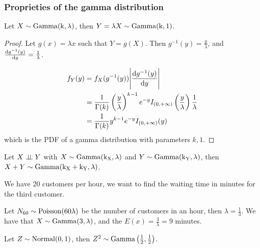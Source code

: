 \documentclass[12pt]{extarticle}
\begin{document}
\subsubsection{Proprieties of the gamma distribution}

\begin{theorem}
    Let $X \sim \operatorfont{Gamma}(k, \lambda)$, then $Y = \lambda X \sim \operatorfont{Gamma}(k, 1)$.
\end{theorem}

\begin{proof}
    Let $g(x) = \lambda x$ such that $Y = g(X)$.
    Then $g^{-1}(y) = \frac{y}{\lambda}$, and $\dv{g^{-1}(y)}{y} = \frac{1}{\lambda}$.

    \begin{align}
        f_Y(y) & = f_X(g^{-1}(y)) \abs{\dv{g^{-1}(y)}{y}}                                                                                           \\
               & = \frac{1}{\Gamma(k)} \left(\frac{y}{\lambda}\right)^{k-1} e^{-y} I_{(0, +\infty)}\left(\frac{y}{\lambda}\right) \frac{1}{\lambda} \\
               & = \frac{1}{\Gamma(k)} y^{k-1} e^{-y} I_{(0, +\infty)}(y)                                                                           \\
    \end{align}
    which is the PDF of a gamma distribution with parameters $k, 1$.
\end{proof}

\begin{theorem}
    Let $X \perp \!\!\! \perp Y$ with $X \sim \operatorfont{Gamma}(k_X, \lambda)$ and $Y \sim \operatorfont{Gamma}(k_Y, \lambda)$, then $X + Y \sim \operatorfont{Gamma}(k_X + k_Y, \lambda)$.
\end{theorem}

\begin{example}
    We have 20 customers per hour, we want to find the waiting time in minutes for the third customer.

    Let $N_{60} \sim \operatorfont{Poisson(60\lambda)}$ be the number of customers in an hour, then $\lambda = \frac{1}{3}$.
    We have that $X \sim \operatorfont{Gamma}(3, \lambda)$, and the $E(x) = \frac{3}{\lambda} = 9$ minutes.
\end{example}

\begin{theorem}
    Let $Z \sim \operatorfont{Normal}(0, 1)$, then $Z^2 \sim \operatorfont{Gamma}\left(\frac{1}{2}, \frac{1}{2}\right)$.
\end{theorem}
\end{document}

